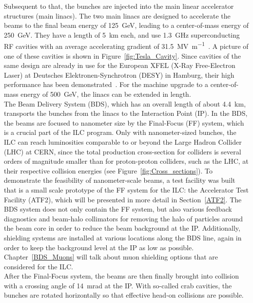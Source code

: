 Subsequent to that, the bunches are injected into the main linear accelerator structures (main linacs).
The two main linacs are designed to accelerate the beams to the final beam energy of \SI{125}{\GeV}, leading to a center-of-mass energy of \SI{250}{\GeV}.
They have a length of \SI{5}{\kilo\meter} each, and use \SI{1.3}{\giga\hertz} superconducting RF cavities with an average accelerating gradient of \SI{31.5}{\mega\volt\per\meter}~\cite{Walker}.
A picture of one of these cavities is shown in Figure~\ref{fig:Tesla_Cavity}. 
Since cavities of the same design are already in use for the European XFEL (X-Ray Free-Electron Laser) at Deutsches Elektronen-Synchrotron (DESY) in Hamburg, their high performance has been demonstrated~\cite{XFEL}.
For the machine upgrade to a center-of-mass energy of \SI{500}{\GeV}, the linacs can be extended in length.\\
The Beam Delivery System (BDS), which has an overall length of about \SI{4.4}{\kilo\meter}, transports the bunches from the linacs to the Interaction Point (IP).
In the BDS, the beams are focused to nanometer size by the Final-Focus (FF) system, which is a crucial part of the ILC program.
Only with nanometer-sized bunches, the ILC can reach luminosities comparable to or beyond the Large Hadron Collider (LHC) at CERN, since the total production cross-section for \positron \electron colliders is several orders of magnitude smaller than for proton-proton colliders, such as the LHC, at their respective collision energies (see Figure~\ref{fig:Cross_sections}).
To demonstrate the feasibility of nanometer-scale beams, a test facility was built that is a small scale prototype of the FF system for the ILC: the Accelerator Test Facility (ATF2), which will be presented in more detail in Section~\ref{ATF2}.
The BDS system does not only contain the FF system, but also various feedback diagnostics and beam-halo collimators for removing the halo of particles around the beam core in order to reduce the beam background at the IP. 
Additionally, shielding systems are installed at various locations along the BDS line, again in order to keep the background level at the IP as low as possible.
Chapter~\ref{BDS_Muons} will talk about muon shielding options that are considered for the ILC.
\\After the Final-Focus system, the beams are then finally brought into collision with a crossing angle of \SI{14}{\milli\radian} at the IP.\cite[p. 9-10]{TDR1}
With so-called crab cavities, the bunches are rotated horizontally so that effective head-on collisions are possible.
